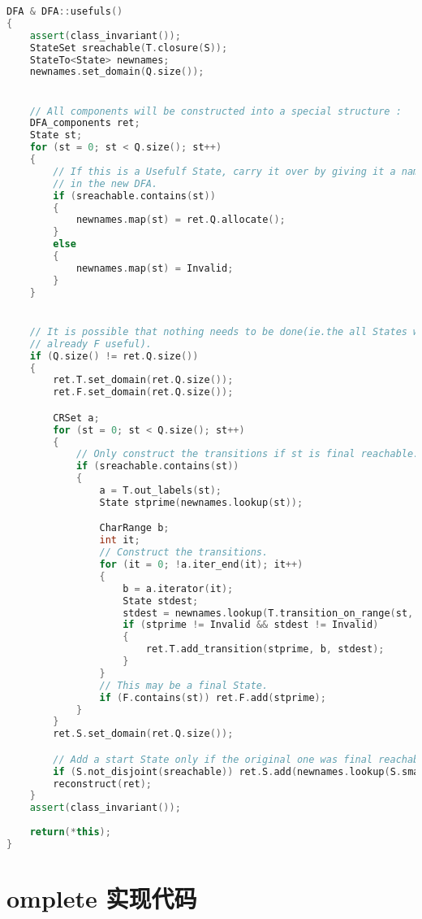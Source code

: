 \begin{lstlisting}[language=C++,label={lst:usefuls-imp},caption={文件 DFA.cpp}]
DFA & DFA::usefuls()
{
    assert(class_invariant());
    StateSet sreachable(T.closure(S));
    StateTo<State> newnames;
    newnames.set_domain(Q.size());


    // All components will be constructed into a special structure :
    DFA_components ret;
    State st;
    for (st = 0; st < Q.size(); st++)
    {
        // If this is a Usefulf State, carry it over by giving it a name
        // in the new DFA.
        if (sreachable.contains(st))
        {
            newnames.map(st) = ret.Q.allocate();
        }
        else
        {
            newnames.map(st) = Invalid;
        }
    }


    // It is possible that nothing needs to be done(ie.the all States were
    // already F useful).
    if (Q.size() != ret.Q.size())
    {
        ret.T.set_domain(ret.Q.size());
        ret.F.set_domain(ret.Q.size());

        CRSet a;
        for (st = 0; st < Q.size(); st++)
        {
            // Only construct the transitions if st is final reachable.
            if (sreachable.contains(st))
            {
                a = T.out_labels(st);
                State stprime(newnames.lookup(st));

                CharRange b;
                int it;
                // Construct the transitions.
                for (it = 0; !a.iter_end(it); it++)
                {
                    b = a.iterator(it);
                    State stdest;
                    stdest = newnames.lookup(T.transition_on_range(st, b));
                    if (stprime != Invalid && stdest != Invalid)
                    {
                        ret.T.add_transition(stprime, b, stdest);
                    }
                }
                // This may be a final State.
                if (F.contains(st)) ret.F.add(stprime);
            }
        }
        ret.S.set_domain(ret.Q.size());

        // Add a start State only if the original one was final reachable.
        if (S.not_disjoint(sreachable)) ret.S.add(newnames.lookup(S.smallest()));
        reconstruct(ret);
    }
    assert(class_invariant());
    
    return(*this);
}
\end{lstlisting}

\section{omplete 实现代码}\label{sec:complete-imp}

